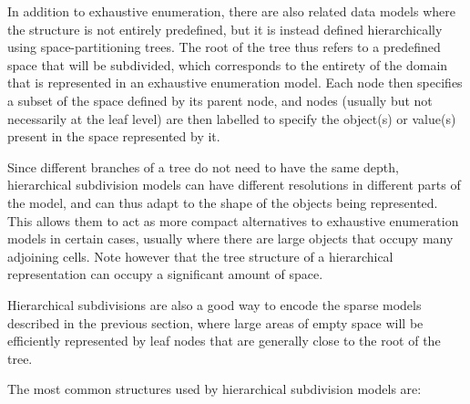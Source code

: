 In addition to exhaustive enumeration, there are also related data models where the structure is not entirely predefined, but it is instead defined hierarchically using space-partitioning trees.
The root of the tree thus refers to a predefined space that will be subdivided, which corresponds to the entirety of the domain that is represented in an exhaustive enumeration model.
Each node then specifies a subset of the space defined by its parent node, and nodes (usually but not necessarily at the leaf level) are then labelled to specify the object(s) or value(s) present in the space represented by it.

Since different branches of a tree do not need to have the same depth, hierarchical subdivision models can have different resolutions in different parts of the model, and can thus adapt to the shape of the objects being represented.
This allows them to act as more compact alternatives to exhaustive enumeration models in certain cases, usually where there are large objects that occupy many adjoining cells.
Note however that the tree structure of a hierarchical representation can occupy a significant amount of space.

Hierarchical subdivisions are also a good way to encode the sparse models described in the previous section, where large areas of empty space will be efficiently represented by leaf nodes that are generally close to the root of the tree.

The most common structures used by hierarchical subdivision models are:

